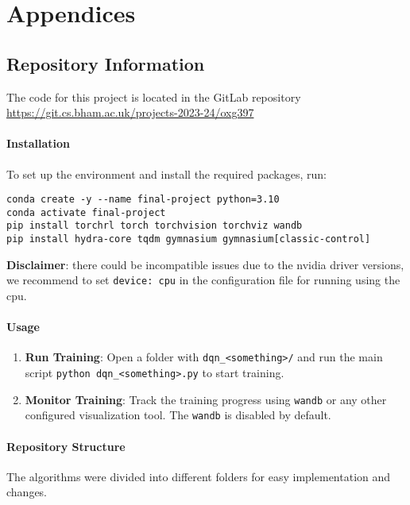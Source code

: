 \appendix
\chapter{Appendices}
\section{Repository Information}

The code for this project is located in the GitLab repository \\\href{https://git.cs.bham.ac.uk/projects-2023-24/oxg397}{https://git.cs.bham.ac.uk/projects-2023-24/oxg397}

\subsubsection{Installation} 
To set up the environment and install the required packages, run:

\begin{verbatim}
conda create -y --name final-project python=3.10
conda activate final-project
pip install torchrl torch torchvision torchviz wandb
pip install hydra-core tqdm gymnasium gymnasium[classic-control]
\end{verbatim}

\textbf{Disclaimer}: there could be incompatible issues due to the nvidia driver versions, we recommend to set \texttt{device: cpu} in the configuration file for running using the cpu.

\subsubsection{Usage}

\begin{enumerate}
    \item \textbf{Run Training}: Open a folder with \texttt{dqn\_<something>/} and run the main script \texttt{python dqn\_<something>.py} to start training.
    \item \textbf{Monitor Training}: Track the training progress using \texttt{wandb} or any other configured visualization tool. The \texttt{wandb} is disabled by default.
\end{enumerate}

\subsubsection{Repository Structure} 
The algorithms were divided into different folders for easy implementation and changes.

